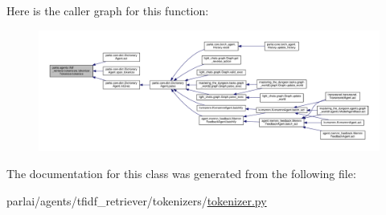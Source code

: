 Here is the caller graph for this function\+:
\nopagebreak
\begin{figure}[H]
\begin{center}
\leavevmode
\includegraphics[width=350pt]{classparlai_1_1agents_1_1tfidf__retriever_1_1tokenizers_1_1tokenizer_1_1Tokenizer_a548699f403463496523213f3cf80c6c6_icgraph}
\end{center}
\end{figure}


The documentation for this class was generated from the following file\+:\begin{DoxyCompactItemize}
\item 
parlai/agents/tfidf\+\_\+retriever/tokenizers/\hyperlink{tokenizer_8py}{tokenizer.\+py}\end{DoxyCompactItemize}
